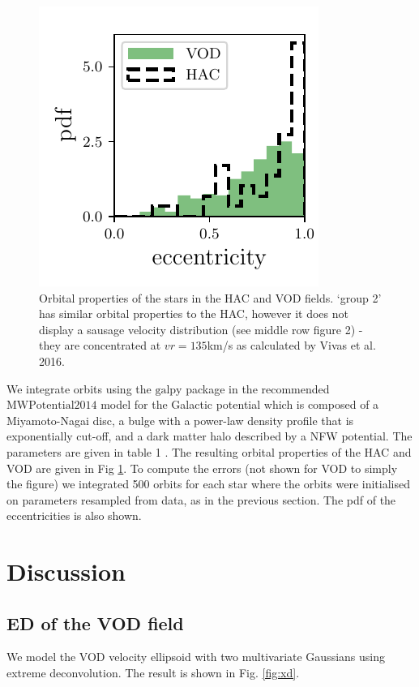 \documentclass[fleqn,usenatbib]{mnras}
\begin{document}
\begin{figure}
    \includegraphics[scale=0.472]{eccentricities.pdf} 
    \caption{ Orbital properties of the stars in the HAC and VOD fields. `group 2' has similar orbital properties to the HAC, however it does not display a sausage velocity distribution (see middle row figure 2) - they are concentrated at $vr =  135 $km/s as calculated by Vivas et al. 2016. }
    \label{fig:orbits}
    
    \end{figure}
We integrate orbits using the $\mathrm{galpy}$ package \citet{Bovy2015} in the recommended  $\mathrm{MWPotential2014}$ model for the Galactic potential which is composed of a Miyamoto-Nagai disc, a bulge with a power-law density profile that is exponentially cut-off, and a dark matter halo described by a NFW potential. The parameters are given in table 1 \citet{Bovy2015}. The resulting orbital properties of the HAC and VOD are given in Fig \ref{fig:orbits}. To compute the errors (not shown for VOD to simply the figure) we integrated 500 orbits for each star where the orbits were initialised on parameters resampled from data, as in the previous section. The pdf of the eccentricities is also shown.

\section{Discussion}
\subsection{ED of the VOD field}
We model the VOD velocity ellipsoid with two multivariate Gaussians using extreme deconvolution. The result is shown in Fig. \ref{fig:xd}.
\end{document}
